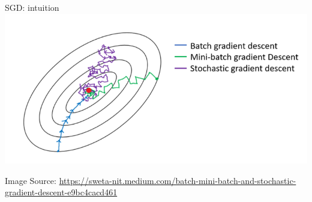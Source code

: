 \begin{frame}{SGD: intuition}
\includegraphics[width=\textwidth]{img/sgd}

{\tiny
Image Source: \url{https://sweta-nit.medium.com/batch-mini-batch-and-stochastic-gradient-descent-e9bc4cacd461}
}
\end{frame}
